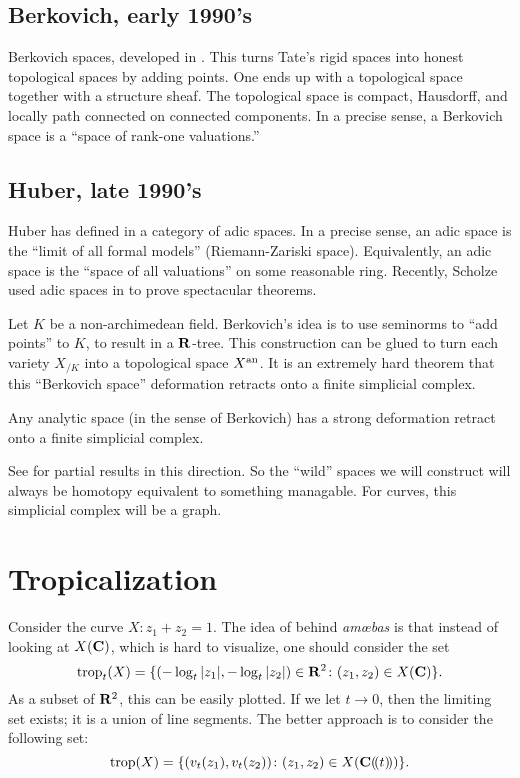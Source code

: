 \subsection{Berkovich, early 1990's}
Berkovich spaces, developed in \cite{berkovich-1990}. This turns Tate's 
rigid spaces into honest topological spaces by adding points. One ends up with 
a topological space together with a structure sheaf. The topological space is 
compact, Hausdorff, and locally path connected on connected components. In a 
precise sense, a Berkovich space is a ``space of rank-one valuations.'' 

\subsection{Huber, late 1990's}
Huber has defined in \cite{huber-1996} a category of adic spaces. In a 
precise sense, an adic 
space is the ``limit of all formal models'' (Riemann-Zariski space). 
Equivalently, an adic space is the ``space of all valuations'' on some 
reasonable ring. Recently, Scholze used adic spaces in \cite{scholze-2012} to prove 
spectacular theorems. 


Let $K$ be a non-archimedean field. Berkovich's idea is to use seminorms 
to ``add points'' to $K$, to result in a $\mathbf{R}$-tree. This construction 
can be glued to turn each variety $X_{/K}$ into a topological space 
$X^{\mathrm{an}}$. It is an extremely 
hard theorem that this ``Berkovich space'' deformation retracts onto a 
finite simplicial complex. 

\begin{theorem_}
Any analytic space (in the sense of Berkovich) has a strong deformation retract 
onto a finite simplicial complex. 
\end{theorem_}

See \cite{berkovich-1999,thuillier-2007} for partial results in this direction. 
So the ``wild'' spaces we will construct will always be homotopy equivalent to 
something managable. For curves, this simplicial complex will be a graph. 





\section{Tropicalization}

Consider the curve $X\colon z_1+z_2=1$. The idea of behind \emph{am\oe{}bas} is that 
instead of looking at $X(\mathbf{C})$, which is hard to visualize, one should consider the 
set 
\[
  \operatorname{trop}_t(X) = \{(-\log_t|z_1|,-\log_t|z_2|)\in \mathbf{R}^2\colon (z_1,z_2)\in X(\mathbf{C})\} .
\]
As a subset of $\mathbf{R}^2$, this can be easily plotted. If we let $t\to 0$, then 
the limiting set exists; it is a union of line segments. The better approach is 
to consider the following set: 
\[
  \operatorname{trop}(X)=\{(v_t(z_1),v_t(z_2))\colon (z_1,z_2)\in X(\mathbf{C}(\!( t)\!))\} .
\]

